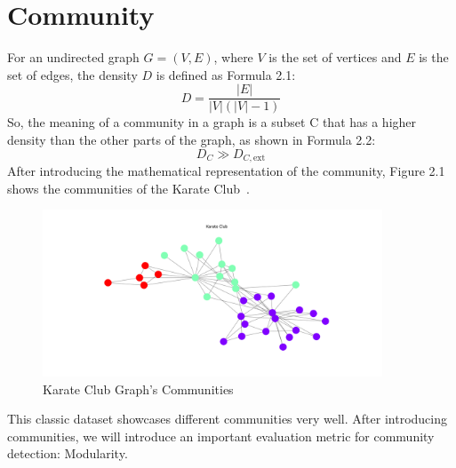 \documentclass[ %
                    author={Tengyao Tu},
                supervisor={Dr. James Pope},
                    degree={MSc},
                     title={A New Perspective on Graph Community Detection: Combining Traditional Methods with Deep Learning Approaches},
                  subtitle={Applying to Telecom Networks and Diverse Datasets},
                      type={},
                      year={2024}]{dissertation}
\begin{document}
\section{Community}
For an undirected graph \( G = (V, E) \), where \( V \) is the set of vertices and \( E \) is the set of edges, the density \( D \) is defined as Formula 2.1:
\begin{equation}
D = \frac{|E|}{|V| (|V| - 1)}
\label{eq:directed_density}
\end{equation}
So, the meaning of a community in a graph is a subset C that has a higher density than the other parts of the graph, as shown in Formula 2.2:
\begin{equation}
   D_{C} \gg D_{C, \text{ext}}
\label{eq:community}
\end{equation}
After introducing the mathematical representation of the community, Figure 2.1 shows the communities of the Karate Club~\cite{zachary1977information}.
\begin{figure}[h!] %
    \centering
    \includegraphics[width=0.9\textwidth]{Figure_1.png} %
    \caption{Karate Club Graph's Communities}
    \label{fig: Karate Club graph's communities}
\end{figure}
This classic dataset showcases different communities very well. After introducing communities, we will introduce an important evaluation metric for community detection: Modularity.
\end{document}
